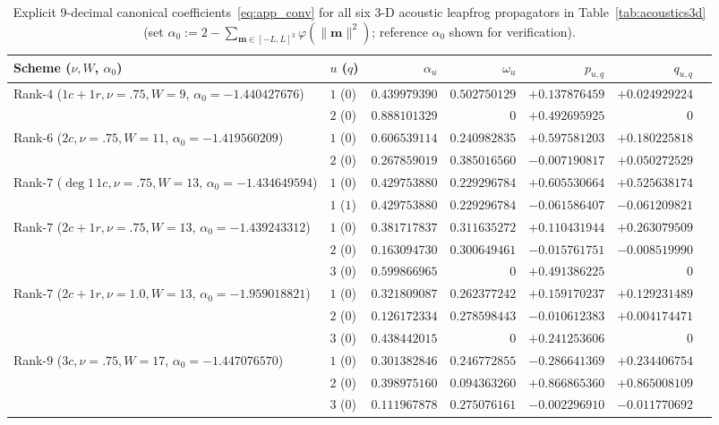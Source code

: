 \documentclass[11pt,a4paper]{article}
\theoremstyle{plain}
\theoremstyle{definition}
\begin{document}
\begin{table}[!htbp]
\centering
\caption{Explicit 9-decimal canonical coefficients~\eqref{eq:app_conv} for all six 3-D acoustic leapfrog propagators in Table~\ref{tab:acoustics3d} (set $\alpha_0 := 2 - \sum_{\mathbf{m} \in [-L,L]^3} \varphi(\|\mathbf{m}\|^2)$; reference $\alpha_0$ shown for verification).}\label{tab:app_acoustics}
\smallskip
{\scriptsize\setlength{\tabcolsep}{1.4pt}
\begin{tabular}{@{}llrrrrr@{}}
\toprule
Scheme ($\nu, W$, $\alpha_0$) & $u$ ($q$) & $\alpha_u$ & $\omega_u$ & $p_{u,q}$ & $q_{u,q}$ \\
\midrule
Rank-$4$ ($1c{+}1r, \nu{=}.75, W{=}9$, $\alpha_0{=}-1.440427676$) & $1$ ($0$) & $0.439979390$ & $0.502750129$ & $+0.137876459$ & $+0.024929224$ \\
 & $2$ ($0$) & $0.888101329$ & $0$ & $+0.492695925$ & $0$ \\
\midrule
Rank-$6$ ($2c, \nu{=}.75, W{=}11$, $\alpha_0{=}-1.419560209$) & $1$ ($0$) & $0.606539114$ & $0.240982835$ & $+0.597581203$ & $+0.180225818$ \\
 & $2$ ($0$) & $0.267859019$ & $0.385016560$ & $-0.007190817$ & $+0.050272529$ \\
\midrule
Rank-$7$ ($\deg 1\,1c, \nu{=}.75, W{=}13$, $\alpha_0{=}-1.434649594$) & $1$ ($0$) & $0.429753880$ & $0.229296784$ & $+0.605530664$ & $+0.525638174$ \\
 & $1$ ($1$) & $0.429753880$ & $0.229296784$ & $-0.061586407$ & $-0.061209821$ \\
\midrule
Rank-$7$ ($2c{+}1r, \nu{=}.75, W{=}13$, $\alpha_0{=}-1.439243312$) & $1$ ($0$) & $0.381717837$ & $0.311635272$ & $+0.110431944$ & $+0.263079509$ \\
 & $2$ ($0$) & $0.163094730$ & $0.300649461$ & $-0.015761751$ & $-0.008519990$ \\
 & $3$ ($0$) & $0.599866965$ & $0$ & $+0.491386225$ & $0$ \\
\midrule
Rank-$7$ ($2c{+}1r, \nu{=}1.0, W{=}13$, $\alpha_0{=}-1.959018821$) & $1$ ($0$) & $0.321809087$ & $0.262377242$ & $+0.159170237$ & $+0.129231489$ \\
 & $2$ ($0$) & $0.126172334$ & $0.278598443$ & $-0.010612383$ & $+0.004174471$ \\
 & $3$ ($0$) & $0.438442015$ & $0$ & $+0.241253606$ & $0$ \\
\midrule
Rank-$9$ ($3c, \nu{=}.75, W{=}17$, $\alpha_0{=}-1.447076570$) & $1$ ($0$) & $0.301382846$ & $0.246772855$ & $-0.286641369$ & $+0.234406754$ \\
 & $2$ ($0$) & $0.398975160$ & $0.094363260$ & $+0.866865360$ & $+0.865008109$ \\
 & $3$ ($0$) & $0.111967878$ & $0.275076161$ & $-0.002296910$ & $-0.011770692$ \\
\bottomrule
\end{tabular}}
\end{table}
\end{document}
